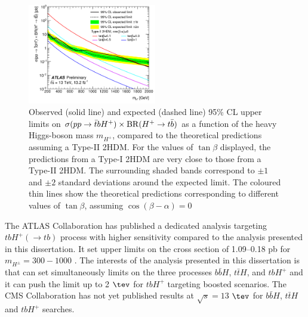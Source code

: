 \begin{figure}[h!]
\centering
\includegraphics[width=0.5\textwidth]{figures/VLQ/fig_23.png}
\captionsetup{width=0.85\textwidth} \caption{\small Observed (solid line) and expected (dashed line) 95\% CL upper limits on $\sigma(pp \to \bar{t}bH^+) \times {\rm BR}(H^+ \to t\bar{b})$ 
as a function of the heavy Higgs-boson mass $m_{H^+}$, compared to the theoretical predictions assuming a Type-II 2HDM. 
For the values of $\tan\beta$ displayed, the predictions from a Type-I 2HDM are very close to those from a Type-II 2HDM.
The surrounding shaded bands correspond to $\pm1$ and $\pm2$ standard deviations around the expected limit. 
The coloured thin lines show the theoretical predictions corresponding to different values of $\tan\beta$, assuming 
$\cos(\beta-\alpha)=0$}
\label{sec:vlq:fig:hbsm3}
\end{figure}


The ATLAS Collaboration \cite{ATLAS-CONF-2016-089} has published a dedicated analysis targeting $tbH^{+}(\to tb)$ process with higher sensitivity compared to the analysis presented in this dissertation. It set upper limits on the cross section of 1.09--0.18 pb for $m_{H^{\pm}}=300-1000$ \gev. The interests of the analysis presented in this dissertation is that can set simultaneously limits on the three processes $b\bar{b}H$, $t\bar{t}H$, and $tbH^{+}$ and it can push the limit up to 2 $\tev$ for $tbH^{+}$ targeting boosted scenarios.  
The CMS Collaboration has not yet published results at $\sqrt{s}=13$ $\tev$ for $b\bar{b}H$, $t\bar{t}H$ and $tbH^{+}$ searches.